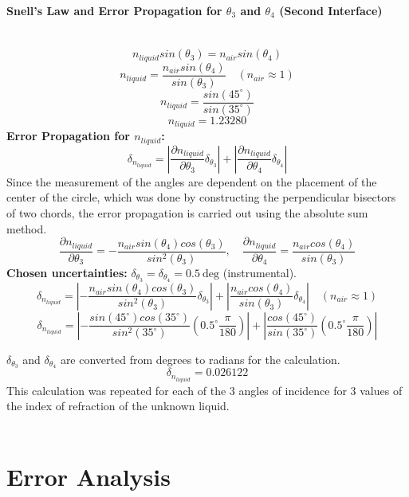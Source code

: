 \documentclass[12pt]{article}
\begin{document}
\paragraph{Snell's Law and Error Propagation for $\theta_3$ and $\theta_4$ (Second Interface)} \mbox{}\\
\[n_{liquid}sin(\theta_3)=n_{air}sin(\theta_4) \]
\[n_{liquid} = \frac{n_{air}sin(\theta_4)}{sin(\theta_3)} \quad (n_{air} \approx 1)\]
\[n_{liquid} = \frac{sin(45^\circ)}{sin(35^\circ)}\]
\[n_{liquid} = 1.23280\]
\textbf{Error Propagation for $n_{liquid}$:}
\[\delta_{n_{liquid}} = \left | \frac{\partial n_{liquid}}{\partial \theta_3}\delta_{\theta_3} \right |+ \left | \frac{\partial n_{liquid}}{\partial \theta_4}\delta_{\theta_4} \right |\]
Since the measurement of the angles are dependent on the placement of the center of the circle, which was done by constructing the perpendicular bisectors of two chords, the error propagation is carried out using the absolute sum method.
\[\frac{\partial n_{liquid}}{\partial \theta_3} = -\frac{n_{air}sin(\theta_4)cos(\theta_3)}{sin^2(\theta_3)}, \quad \frac{\partial n_{liquid}}{\partial \theta_4} =\frac{n_{air}cos(\theta_4)}{sin(\theta_3)} \]
\textbf{Chosen uncertainties:} $\delta_{\theta_3} = \delta_{\theta_4} = 0.5~\mathrm{deg}$ (instrumental).
\[\delta_{n_{liquid}} = \left|-\frac{n_{air}sin(\theta_4)cos(\theta_3)}{sin^2(\theta_3)}\delta_{\theta_3}\right| + \left|\frac{n_{air}cos(\theta_4)}{sin(\theta_3)}\delta_{\theta_4} \right| \quad (n_{air} \approx 1)\]
\[\delta_{n_{liquid}} = \left|-\frac{sin(45^\circ)cos(35^\circ)}{sin^2(35^\circ)}\left(0.5^\circ \frac{\pi}{180}\right)\right| + \left|\frac{cos(45^\circ)}{sin(35^\circ)}\left(0.5^\circ \frac{\pi}{180}\right) \right|\]


$\delta_{\theta_3}$ and $\delta_{\theta_4}$ are converted from degrees to radians for the calculation.
\[\delta_{n_{liquid}} = 0.026122\]
This calculation was repeated for each of the 3 angles of incidence for 3 values of the index of refraction of the unknown liquid.\\  \\


\section{Error Analysis}
\end{document}
